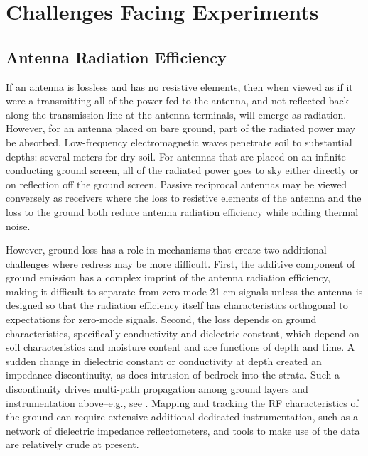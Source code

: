\section{Challenges Facing Experiments}

\subsection{Antenna Radiation Efficiency}

If an antenna is lossless and has no resistive elements, then when viewed as if it were a transmitting all of the power fed to the antenna, and not reflected back along the transmission line at the antenna terminals, will emerge as radiation.  However, for an antenna placed on bare ground, part of the radiated power may be absorbed.  Low-frequency electromagnetic waves penetrate soil to substantial depths: several meters for dry soil. For antennas that are placed on an infinite conducting ground screen, all of the radiated power goes to sky either directly or on reflection off the ground screen. Passive reciprocal antennas may be viewed conversely as receivers where the loss to resistive elements of the antenna and the loss to the ground both reduce antenna radiation efficiency while adding thermal noise.
   
However, ground loss has a role in mechanisms that create two additional challenges where redress may be more difficult. First, the additive component of ground emission has a complex imprint of the antenna radiation efficiency, making it difficult to separate from zero-mode 21-cm signals unless the antenna is designed so that the radiation efficiency itself has characteristics orthogonal to expectations for zero-mode signals.  Second, the loss depends on ground characteristics, specifically conductivity and dielectric constant, which depend on soil characteristics and moisture content and are functions of depth and time. A sudden change in dielectric constant or conductivity at depth created an impedance discontinuity, as does intrusion of bedrock into the strata.  Such a discontinuity drives multi-path propagation among ground layers and instrumentation above--e.g., see \cite{bradley19}.  Mapping and tracking the RF characteristics of the ground can require extensive additional dedicated instrumentation, such as a network of dielectric impedance reflectometers, and tools to make use of the data are relatively crude at present.
   
